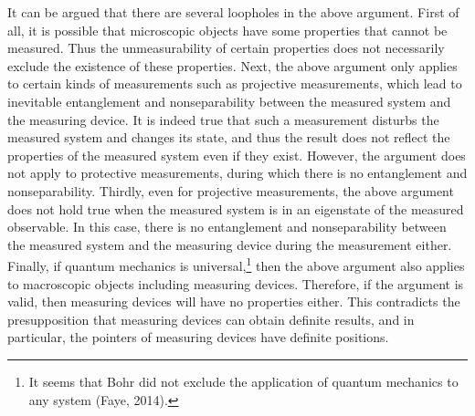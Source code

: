 It can be argued that there are several loopholes in the above argument. First of all, it is possible that microscopic objects have some properties that cannot be measured. Thus the unmeasurability of certain properties does not necessarily exclude the existence of these properties. 
Next, the above argument only applies to certain kinds of measurements such as projective measurements, which lead to inevitable entanglement and nonseparability between the measured system and the measuring device. It is indeed true that such a measurement disturbs the measured system and changes its state, and thus the result does not reflect the  properties of the measured system even if they exist. However, the argument does not apply to protective measurements, during which there is no entanglement and nonseparability. Thirdly, even for projective measurements, the above argument does not hold true when the measured system is in an eigenstate of the measured observable. In this case, there is no entanglement and nonseparability between the measured system and the measuring device during the measurement either. Finally, if quantum mechanics is universal,\footnote{It seems that Bohr did not exclude the application of quantum mechanics to any system (Faye, 2014).} then the above argument also applies to macroscopic objects including measuring devices. Therefore, if the argument is valid, then measuring devices will have no properties either. This contradicts the presupposition that measuring devices can obtain definite results, and in particular, the pointers of measuring devices have definite positions.

